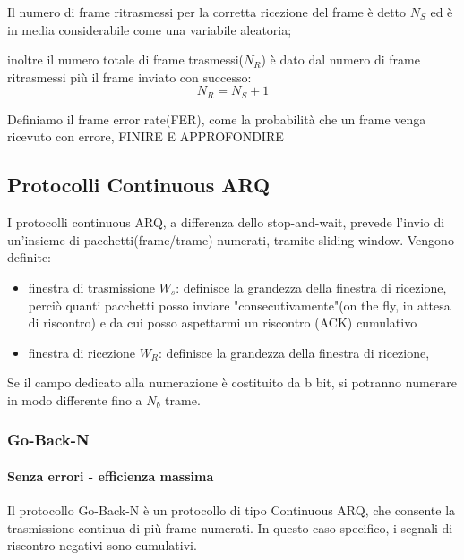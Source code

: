 Il numero di frame ritrasmessi per la corretta ricezione del frame è detto $N_S$ ed è in media considerabile come una variabile aleatoria;

inoltre il numero totale di frame trasmessi($N_R$) è dato dal numero di frame ritrasmessi più il frame inviato con successo:
\begin{equation}
N_R = N_S + 1
\end{equation}


Definiamo il frame error rate(FER), come la probabilità che un frame venga ricevuto con errore, FINIRE E APPROFONDIRE

\newpage
\subsection{Protocolli Continuous ARQ}
I protocolli continuous ARQ, a differenza dello stop-and-wait, prevede l'invio di un'insieme di pacchetti(frame/trame) numerati, tramite sliding window.
Vengono definite:
\begin{itemize}
    \item finestra di trasmissione $W_s$: definisce la grandezza della finestra di ricezione, perciò quanti pacchetti posso inviare "consecutivamente"(on the fly, in attesa di riscontro) e da cui posso aspettarmi un riscontro (ACK) cumulativo
    \item finestra di ricezione  $W_R$: definisce la grandezza della finestra di ricezione, 
\end{itemize} 
Se il campo dedicato alla numerazione è costituito da b bit, si potranno
numerare in modo differente fino a $N_b$ trame. 


\subsubsection{Go-Back-N}
\paragraph{Senza errori - efficienza massima}
Il protocollo Go-Back-N è un protocollo di tipo Continuous ARQ, che consente la trasmissione continua di più frame numerati. In questo caso specifico, i segnali di riscontro negativi sono cumulativi.

